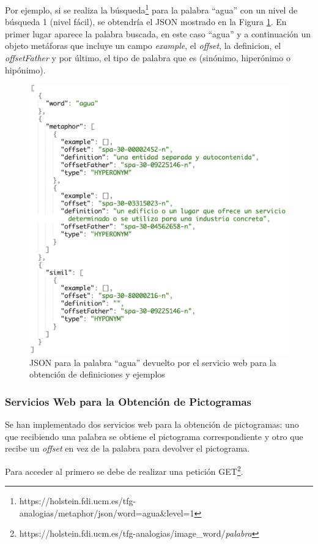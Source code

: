Por ejemplo, si se realiza la búsqueda\footnote{https://holstein.fdi.ucm.es/tfg-analogias/metaphor/json/word=agua\&level=1} para la palabra ``agua'' con un nivel de búsqueda 1 (nivel fácil), se obtendría el JSON mostrado en la Figura \ref{fig:peticionDefYEjemplos}. En primer lugar aparece la palabra buscada, en este caso ``agua'' y a continuación un objeto metáforas que incluye un campo \textit{example}, el \textit{offset}, la definicion, el \textit{offsetFather} y por último, el tipo de palabra que es (sinónimo, hiperónimo o hipónimo).

 

\begin{figure}[!h]
	\includegraphics[width=.6\textwidth]{Imagenes/Bitmap/Capitulo4/JSON-SW/def_example.png}
	\centering
	\caption{JSON para la palabra ``agua'' devuelto por el servicio web para la obtención de definiciones y ejemplos}
	\label{fig:peticionDefYEjemplos}
\end{figure}






\subsubsection{Servicios Web para la Obtención de Pictogramas}
\label{cap:subsec:sw_pictos}

Se han implementado dos servicios web para la obtención de pictogramas: uno que recibiendo una palabra se obtiene el pictograma correspondiente y otro que recibe un \textit{offset} en vez de la palabra para devolver el pictograma. 

Para acceder al primero se debe de realizar una petición GET\footnote{https://holstein.fdi.ucm.es/tfg-analogias/image\_word/\textit{palabra}}.


